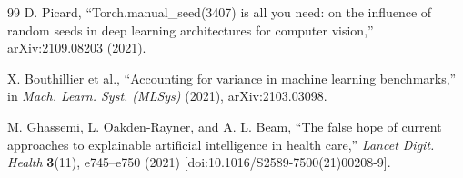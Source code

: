 \documentclass[12pt,letterpaper]{article}
\begin{document}
{\begin{thebibliography}{99}
D. Picard, ``Torch.manual\_seed(3407) is all you need: on the influence of random seeds in deep learning architectures for computer vision,'' arXiv:2109.08203 (2021).

X. Bouthillier et al., ``Accounting for variance in machine learning benchmarks,'' in \textit{Mach. Learn. Syst. (MLSys)} (2021), arXiv:2103.03098.

M. Ghassemi, L. Oakden-Rayner, and A. L. Beam, ``The false hope of current approaches to explainable artificial intelligence in health care,'' \textit{Lancet Digit. Health} \textbf{3}(11), e745--e750 (2021) [doi:10.1016/S2589-7500(21)00208-9].

\end{thebibliography}
}
\end{document}
